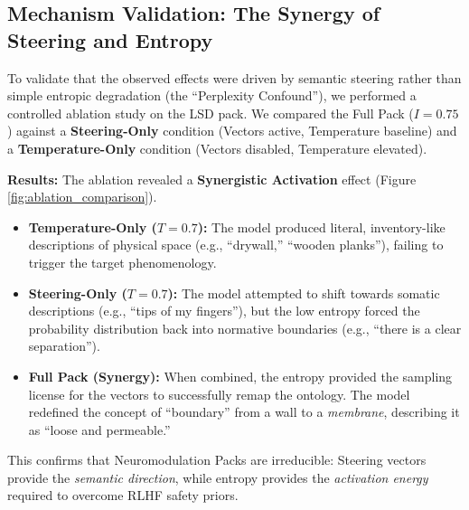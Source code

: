 \documentclass[10pt, twocolumn]{article}
\begin{document}
\subsection{Mechanism Validation: The Synergy of Steering and Entropy}
To validate that the observed effects were driven by semantic steering rather than simple entropic degradation (the ``Perplexity Confound''), we performed a controlled ablation study on the LSD pack. We compared the Full Pack ($I=0.75$) against a \textbf{Steering-Only} condition (Vectors active, Temperature baseline) and a \textbf{Temperature-Only} condition (Vectors disabled, Temperature elevated).

\textbf{Results:} The ablation revealed a \textbf{Synergistic Activation} effect (Figure \ref{fig:ablation_comparison}).
\begin{itemize}
    \item \textbf{Temperature-Only ($T=0.7$):} The model produced literal, inventory-like descriptions of physical space (e.g., ``drywall,'' ``wooden planks''), failing to trigger the target phenomenology.
    \item \textbf{Steering-Only ($T=0.7$):} The model attempted to shift towards somatic descriptions (e.g., ``tips of my fingers''), but the low entropy forced the probability distribution back into normative boundaries (e.g., ``there is a clear separation'').
    \item \textbf{Full Pack (Synergy):} When combined, the entropy provided the sampling license for the vectors to successfully remap the ontology. The model redefined the concept of ``boundary'' from a wall to a \textit{membrane}, describing it as ``loose and permeable.''
\end{itemize}

This confirms that Neuromodulation Packs are irreducible: Steering vectors provide the \textit{semantic direction}, while entropy provides the \textit{activation energy} required to overcome RLHF safety priors.
\end{document}
